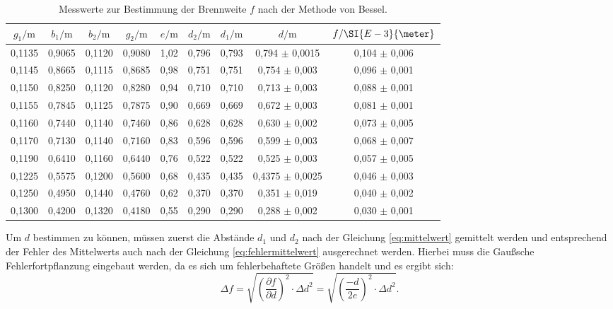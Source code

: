 \begin{table}[htpb]
	\centering
	\caption{Messwerte zur Bestimmung der Brennweite $f$ nach der Methode von Bessel.}
	\label{tab:zweiterVersuchsteil}
	\begin{tabular}{c c c c c c c c c }
		\toprule
		$g_1 / \si{\meter}$ & $b_1 / \si{\meter}$ & $b_2 /\si{\meter}$ & $g_2/ \si{\meter}$ & $e / \si{\meter}$ & $d_2 / \si{\meter}$ & $d_1 / \si{\meter}$ & $d / \si{\meter}$& $f / \SI{E-3}{\meter}$  \\
		\midrule
	    0,1135 &0,9065 & 0,1120 &0,9080 & 1,02 & 0,796 & 0,793& 0,794 $\pm$ 0,0015 & 0,104 $\pm$ 0,006 \\
	    0,1145 &0,8665 & 0,1115 &0,8685 & 0,98 & 0,751 & 0,751& 0,754 $\pm$ 0,003 & 0,096 $\pm$ 0,001 \\
	    0,1150 &0,8250 & 0,1120 &0,8280 & 0,94 & 0,710 & 0,710& 0,713 $\pm$ 0,003 & 0,088 $\pm$ 0,001 \\
	    0,1155 &0,7845 & 0,1125 &0,7875 & 0,90 & 0,669 & 0,669& 0,672 $\pm$ 0,003 & 0,081 $\pm$ 0,001 \\
 	    0,1160 &0,7440 & 0,1140 &0,7460 & 0,86 & 0,628 & 0,628& 0,630 $\pm$ 0,002 & 0,073 $\pm$ 0,005 \\
	    0,1170 &0,7130 & 0,1140 &0,7160 & 0,83 & 0,596 & 0,596& 0,599 $\pm$ 0,003 & 0,068 $\pm$ 0,007 \\
	    0,1190 &0,6410 & 0,1160 &0,6440 & 0,76 & 0,522 & 0,522& 0,525 $\pm$ 0,003 & 0,057 $\pm$ 0,005 \\
	    0,1225 &0,5575 & 0,1200 &0,5600 & 0,68 & 0,435 & 0,435& 0,4375 $\pm$ 0,0025 & 0,046 $\pm$ 0,003 \\
	    0,1250 &0,4950 & 0,1440 &0,4760 & 0,62 & 0,370 & 0,370& 0,351 $\pm$ 0,019 & 0,040 $\pm$ 0,002 \\
	    0,1300 &0,4200 & 0,1320 &0,4180 & 0,55 & 0,290 & 0,290& 0,288 $\pm$ 0,002 & 0,030 $\pm$ 0,001 \\
		\bottomrule
	\end{tabular}
\end{table}

Um $d$ bestimmen zu können, müssen zuerst die Abstände $d_1$ und $d_2$ nach der Gleichung \ref{eq:mittelwert} gemittelt werden und entsprechend der Fehler des Mittelwerts auch nach der Gleichung \ref{eq:fehlermittelwert} ausgerechnet werden. Hierbei muss die Gaußsche Fehlerfortpflanzung eingebaut werden, da es sich um fehlerbehaftete Größen handelt und es ergibt sich:
\begin{equation}
\label{eq:fehlergauß}
\Delta f = \sqrt{\left(\frac{\partial f}{\partial d}\right)^2 \cdot \Delta d^2} = \sqrt{\left(\frac{-d}{2e}\right)^2 \cdot \Delta d^2}.
\end{equation}

